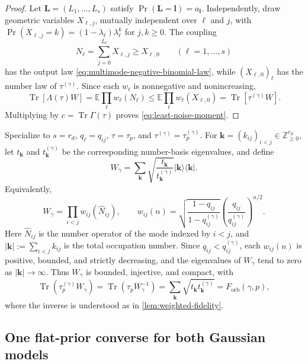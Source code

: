 \documentclass[11pt]{article}
\theoremstyle{remark}
\theoremstyle{plain}
\newcommand{\Tr}{\operatorname{Tr}}
\newcommand{\proj}[1]{|#1\rangle\!\langle #1|}
\newcommand{\Forb}{F_{\mathrm{orb}}}
\begin{document}
\begin{proof}
Let \(\mathbf L=(L_1,\ldots,L_s)\) satisfy
\(\Pr(\mathbf L=\mathbf l)=a_{\mathbf l}\).
Independently, draw geometric variables \(X_{\ell,j}\), mutually
independent over \(\ell\) and \(j\), with
\(\Pr(X_{\ell,j}=k)=(1-\lambda_\ell)\lambda_\ell^k\) for
\(j,k\ge0\).
The coupling
\[
  N_\ell=\sum_{j=0}^{L_\ell}X_{\ell,j}\ge X_{\ell,0}
  \qquad(\ell=1,\ldots,s)
\]
has the output law \eqref{eq:multimode-negative-binomial-law}, while
\((X_{\ell,0})_\ell\) has the number law of \(\tau^{(\gamma)}\).
Since each \(w_\ell\) is nonnegative and nonincreasing,
\[
  \Tr[\Lambda(\tau)W]
  =\mathbb E\prod_\ell w_\ell(N_\ell)
  \le\mathbb E\prod_\ell w_\ell(X_{\ell,0})
  =\Tr[\tau^{(\gamma)}W].
\]
Multiplying by \(c=\Tr\Gamma(\tau)\) proves
\eqref{eq:least-noise-moment}.
\end{proof}

Specialize to \(s=r_d\), \(q_\ell=q_{ij}\),
\(\tau=\tau_p\), and \(\tau^{(\gamma)}=\tau_p^{(\gamma)}\).
For
\(\mathbf k=(k_{ij})_{i<j}\in\mathbb Z_{\ge0}^{r_d}\), let
\(t_{\mathbf k}\) and \(t_{\mathbf k}^{(\gamma)}\) be the corresponding
number-basis eigenvalues, and define
\begin{equation}\label{eq:quantum-witness}
  W_\gamma
  =\sum_{\mathbf k}
  \sqrt{\frac{t_{\mathbf k}}{t_{\mathbf k}^{(\gamma)}}}
  \proj{\mathbf k}.
\end{equation}
Equivalently,
\[
  W_\gamma=\prod_{i<j}w_{ij}(\widehat N_{ij}),
  \qquad
  w_{ij}(n)=
  \sqrt{\frac{1-q_{ij}}{1-q_{ij}^{(\gamma)}}}
  \left(\frac{q_{ij}}{q_{ij}^{(\gamma)}}\right)^{n/2}.
\]
Here \(\widehat N_{ij}\) is the number operator of the mode indexed by
\(i<j\), and \(\lvert\mathbf k\rvert:=\sum_{i<j}k_{ij}\) is the total
occupation number.
Since \(q_{ij}<q_{ij}^{(\gamma)}\), each \(w_{ij}(n)\) is positive, bounded,
and strictly decreasing, and the eigenvalues of \(W_\gamma\) tend to zero
as \(\lvert\mathbf k\rvert\to\infty\).  Thus \(W_\gamma\) is bounded,
injective, and compact, with
\begin{equation}\label{eq:quantum-witness-identities}
  \Tr(\tau_p^{(\gamma)}W_\gamma)
  =\Tr(\tau_p W_\gamma^{-1})
  =\sum_{\mathbf k}\sqrt{t_{\mathbf k}t_{\mathbf k}^{(\gamma)}}
  =\Forb(\gamma,p),
\end{equation}
where the inverse is understood as in \cref{lem:weighted-fidelity}.

\subsection{One flat-prior converse for both Gaussian models}
\end{document}
